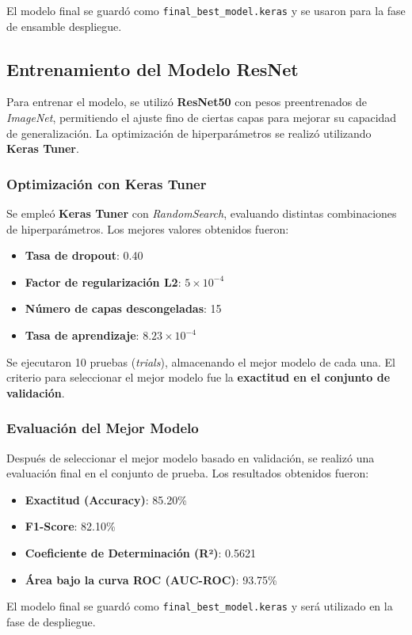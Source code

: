 El modelo final se guardó como \texttt{final\_best\_model.keras} y se usaron para
la fase de ensamble despliegue.

\subsection{Entrenamiento del Modelo ResNet}

Para entrenar el modelo, se utilizó \textbf{ResNet50} con pesos preentrenados de
\textit{ImageNet}, permitiendo el ajuste fino de ciertas capas para mejorar su
capacidad de generalización. La optimización de hiperparámetros se realizó
utilizando \textbf{Keras Tuner}.

\subsubsection{Optimización con Keras Tuner}
Se empleó \textbf{Keras Tuner} con \textit{RandomSearch}, evaluando distintas
combinaciones de hiperparámetros. Los mejores valores obtenidos fueron:

\begin{itemize}
    \item \textbf{Tasa de dropout}: 0.40
    \item \textbf{Factor de regularización L2}: $5 \times 10^{-4}$
    \item \textbf{Número de capas descongeladas}: 15
    \item \textbf{Tasa de aprendizaje}: $8.23 \times 10^{-4}$
\end{itemize}

Se ejecutaron 10 pruebas (\textit{trials}), almacenando el mejor modelo de cada una.
El criterio para seleccionar el mejor modelo fue la \textbf{exactitud en el conjunto de
validación}.

\subsubsection{Evaluación del Mejor Modelo}

Después de seleccionar el mejor modelo basado en validación, se realizó una evaluación final en el conjunto de prueba.
Los resultados obtenidos fueron:

\begin{itemize}
    \item \textbf{Exactitud (Accuracy)}: 85.20\%
    \item \textbf{F1-Score}: 82.10\%
    \item \textbf{Coeficiente de Determinación (R²)}: 0.5621
    \item \textbf{Área bajo la curva ROC (AUC-ROC)}: 93.75\%
\end{itemize}

El modelo final se guardó como \texttt{final\_best\_model.keras} y será utilizado
en la fase de despliegue.
